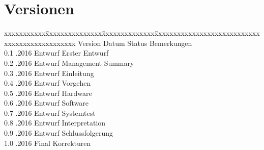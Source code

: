 
\color{black}
\chapter*{Versionen}
\vspace{10mm}

\fontsize{10pt}{18pt}\selectfont
\begin{tabbing}
xxxxxxxxxxx\=xxxxxxxxxxxxxxx\=xxxxxxxxxxxxxx\=xxxxxxxxxxxxxxxxxxxxxxxxxxxxxxxxxxxxxxxxxxxxxxx \kill
Version	\> Datum	\> Status		\> Bemerkungen			\\
0.1	.2016	\> Entwurf		\> Erster Entwurf		\\	
0.2 .2016	\> Entwurf		\> Management Summary 	\\
0.3 .2016	\> Entwurf		\> Einleitung 			\\
0.4 .2016	\> Entwurf		\> Vorgehen 			\\
0.5 .2016	\> Entwurf		\> Hardware 			\\
0.6 .2016	\> Entwurf		\> Software 			\\
0.7 .2016	\> Entwurf		\> Systemtest 			\\
0.8 .2016	\> Entwurf		\> Interpretation 		\\
0.9 .2016	\> Entwurf		\> Schlussfolgerung 	\\
1.0 .2016	\> Final		\> Korrekturen		 	\\
	
\end{tabbing}


